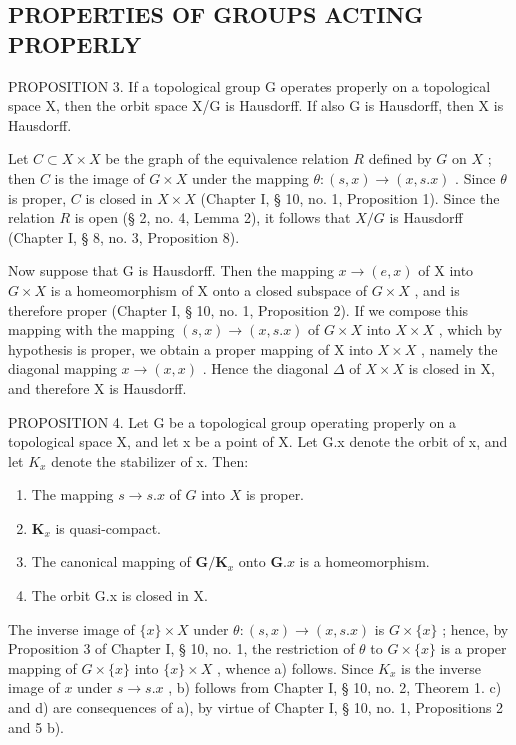 \subsection{PROPERTIES OF GROUPS ACTING PROPERLY}

PROPOSITION 3. If a topological group G operates properly on a topological space X, then the orbit space X/G is Hausdorff. If also G is Hausdorff, then X is Hausdorff.

Let \(C \subset X \times X\) be the graph of the equivalence relation \(R\) defined by \(G\) on \(X\) ; then \(C\) is the image of \(G \times X\) under the mapping \(\theta : (s, x) \to (x, s.x)\) . Since \(\theta\) is proper, \(C\) is closed in \(X \times X\) (Chapter I, § 10, no. 1, Proposition 1). Since the relation \(R\) is open (§ 2, no. 4, Lemma 2), it follows that \(X/G\) is Hausdorff (Chapter I, § 8, no. 3, Proposition 8).

Now suppose that G is Hausdorff. Then the mapping \(x \to (e, x)\) of X into \(G \times X\) is a homeomorphism of X onto a closed subspace of \(G \times X\) , and is therefore proper (Chapter I, § 10, no. 1, Proposition 2). If we compose this mapping with the mapping \((s, x) \to (x, s.x)\) of \(G \times X\) into \(X \times X\) , which by hypothesis is proper, we obtain a proper mapping of X into \(X \times X\) , namely the diagonal mapping \(x \to (x, x)\) . Hence the diagonal \(\Delta\) of \(X \times X\) is closed in X, and therefore X is Hausdorff.

PROPOSITION 4. Let G be a topological group operating properly on a topological space X, and let x be a point of X. Let G.x denote the orbit of x, and let \(K_{x}\) denote the stabilizer of x. Then:

\begin{enumerate}
\def\labelenumi{\alph{enumi})}
\item
  The mapping \(s \to s.x\) of \(G\) into \(X\) is proper.
\item
  \(\mathbf{K}_x\) is quasi-compact.
\item
  The canonical mapping of \(\mathbf{G} / \mathbf{K}_x\) onto \(\mathbf{G}.x\) is a homeomorphism.
\item
  The orbit G.x is closed in X.
\end{enumerate}

The inverse image of \(\{x\} \times X\) under \(\theta : (s, x) \to (x, s.x)\) is \(G \times \{x\}\) ; hence, by Proposition 3 of Chapter I, § 10, no. 1, the restriction of \(\theta\) to \(G \times \{x\}\) is a proper mapping of \(G \times \{x\}\) into \(\{x\} \times X\) , whence a) follows. Since \(K_x\) is the inverse image of \(x\) under \(s \to s.x\) , b) follows from Chapter I, § 10, no. 2, Theorem 1. c) and d) are consequences of a), by virtue of Chapter I, § 10, no. 1, Propositions 2 and 5 b).

